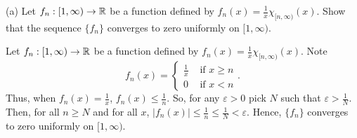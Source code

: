 \begin{list}
\item (a) Let $f_n: [1, \infty) \rightarrow {\mathbb R}$ be a function defined by $f_n(x)=\frac{1}{x}\chi_{[n, \infty)}(x)$. Show that the sequence $\{f_n\}$ converges to zero uniformly on $[1, \infty)$. 
\begin{pf} Let $f_n: [1, \infty) \rightarrow {\mathbb R}$ be a function defined by $f_n(x)=\frac{1}{x}\chi_{[n, \infty)}(x)$. Note \[
f_n(x) = \left\{
\begin{array}{ll}
\frac{1}{x} & \text{ if } x \geq n \\
0 & \text{ if } x < n
\end{array} \right. .
\]
Thus, when $f_n(x) = \frac{1}{x}$, $f_n(x) \leq \frac{1}{n}$. So, for any $\varepsilon>0$ pick $N$ such that $\varepsilon > \frac{1}{N}$. Then, for all $n \geq N$ and for all $x$, $|f_n (x)|\leq \frac{1}{n} \leq \frac{1}{N}< \varepsilon$. Hence, $\{f_n\}$ converges to zero uniformly on $[1, \infty)$.
\end{pf}


\end{list}
